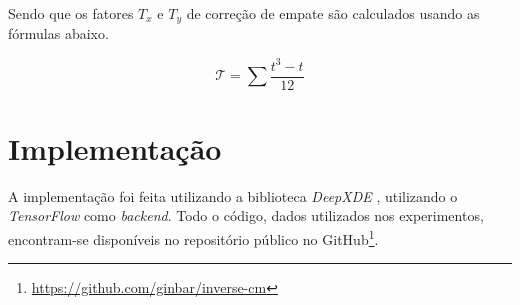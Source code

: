 Sendo que os fatores $T_x$ e $T_y$ de correção de empate são calculados
usando as fórmulas abaixo.  

\begin{equation}
\mathcal{T} = \sum \frac{t^3 - t}{12}
\end{equation}


\section{Implementação}

A implementação foi feita utilizando a biblioteca \textit{DeepXDE} \cite{lu-etal:21-deepxde}, 
utilizando o \textit{TensorFlow} \cite{tensorflow:16} como \textit{backend}. 
Todo o código, dados utilizados nos experimentos,
encontram-se disponíveis no repositório público no 
GitHub\footnote{\url{https://github.com/ginbar/inverse-cm}}.
